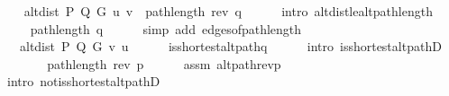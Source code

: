 \begin{isabellebody}
\ \ \isamarkupfalse%
\ {\isachardoublequoteopen}alt{\isacharunderscore}{\kern0pt}dist\ P\ Q\ G\ u\ v\ {\isasymle}\ path{\isacharunderscore}{\kern0pt}length\ {\isacharparenleft}{\kern0pt}rev\ q{\isacharparenright}{\kern0pt}{\isachardoublequoteclose}\isanewline
\ \ \ \ \isamarkupfalse%
\ {\isacharparenleft}{\kern0pt}intro\ alt{\isacharunderscore}{\kern0pt}dist{\isacharunderscore}{\kern0pt}le{\isacharunderscore}{\kern0pt}alt{\isacharunderscore}{\kern0pt}path{\isacharunderscore}{\kern0pt}length{\isacharparenright}{\kern0pt}\isanewline
\ \ \isamarkupfalse%
\ \isamarkupfalse%
\ {\isachardoublequoteopen}{\isachardot}{\kern0pt}{\isachardot}{\kern0pt}{\isachardot}{\kern0pt}\ {\isacharequal}{\kern0pt}\ path{\isacharunderscore}{\kern0pt}length\ q{\isachardoublequoteclose}\isanewline
\ \ \ \ \isamarkupfalse%
\ {\isacharparenleft}{\kern0pt}simp\ add{\isacharcolon}{\kern0pt}\ edges{\isacharunderscore}{\kern0pt}of{\isacharunderscore}{\kern0pt}path{\isacharunderscore}{\kern0pt}length{\isacharparenright}{\kern0pt}\isanewline
\ \ \isamarkupfalse%
\ \isamarkupfalse%
\ {\isachardoublequoteopen}{\isachardot}{\kern0pt}{\isachardot}{\kern0pt}{\isachardot}{\kern0pt}\ {\isacharequal}{\kern0pt}\ alt{\isacharunderscore}{\kern0pt}dist\ P\ Q\ G\ v\ u{\isachardoublequoteclose}\isanewline
\ \ \ \ \isamarkupfalse%
\ is{\isacharunderscore}{\kern0pt}shortest{\isacharunderscore}{\kern0pt}alt{\isacharunderscore}{\kern0pt}path{\isacharunderscore}{\kern0pt}q\isanewline
\ \ \ \ \isamarkupfalse%
\ {\isacharparenleft}{\kern0pt}intro\ is{\isacharunderscore}{\kern0pt}shortest{\isacharunderscore}{\kern0pt}alt{\isacharunderscore}{\kern0pt}pathD{\isacharparenleft}{\kern0pt}{}{\isacharparenright}{\kern0pt}{\isacharparenright}{\kern0pt}\isanewline
\ \ \isamarkupfalse%
\ \isamarkupfalse%
\ {\isachardoublequoteopen}{\isachardot}{\kern0pt}{\isachardot}{\kern0pt}{\isachardot}{\kern0pt}\ {\isacharless}{\kern0pt}\ path{\isacharunderscore}{\kern0pt}length\ {\isacharparenleft}{\kern0pt}rev\ p{\isacharparenright}{\kern0pt}{\isachardoublequoteclose}\isanewline
\ \ \ \ \isamarkupfalse%
\ assm\ alt{\isacharunderscore}{\kern0pt}path{\isacharunderscore}{\kern0pt}rev{\isacharunderscore}{\kern0pt}p\isanewline
\ \ \ \ \isamarkupfalse%
\ {\isacharparenleft}{\kern0pt}intro\ not{\isacharunderscore}{\kern0pt}is{\isacharunderscore}{\kern0pt}shortest{\isacharunderscore}{\kern0pt}alt{\isacharunderscore}{\kern0pt}pathD{\isacharparenright}{\kern0pt}\isanewline

\end{isabellebody}
